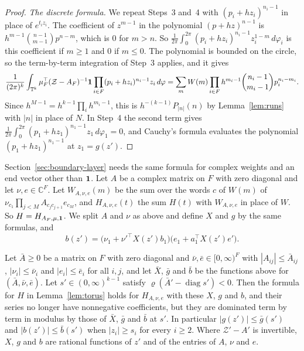 \begin{proof}
\emph{The discrete formula.} We repeat Steps~3 and~4 with $(p_i+hz_i)^{n_i-1}$ in
place of $e^{t_iz_i}$. The coefficient of $z^{m-1}$ in the polynomial
$(p+hz)^{n-1}$ is $h^{m-1}\binom{n-1}{m-1}p^{n-m}$, which is $0$ for $m>n$. So
$\frac1{2\pi}\int_0^{2\pi}(p_i+hz_i)^{n_i-1}z_i^{1-m}\,d\varphi_i$ is this
coefficient if $m\ge1$ and $0$ if $m\le0$. The polynomial is bounded on the
circle, so the term-by-term integration of Step~3 applies, and it gives
\[
\frac1{(2\pi)^k}\int_{\mathbb T^k}\mu_F^\top(\mathcal Z-A_F)^{-1}\mathbf{1}
\prod_{i\in F}(p_i+hz_i)^{n_i-1}z_i\,d\varphi
=\sum_mW(m)\prod_{i\in F}h^{m_i-1}\binom{n_i-1}{m_i-1}p_i^{n_i-m_i}.
\]
Since $h^{M-1}=h^{k-1}\prod_ih^{m_i-1}$, this is $h^{-(k-1)}P_{|n|}(n)$ by
Lemma~\ref{lem:runs} with $|n|$ in place of $N$. In Step~4 the second term gives
$\frac1{2\pi}\int_0^{2\pi}(p_1+hz_1)^{n_1-1}z_1\,d\varphi_1=0$, and Cauchy's formula
evaluates the polynomial $(p_1+hz_1)^{n_1-1}$ at $z_1=g(z')$.
\end{proof}

Section~\ref{sec:boundary-layer} needs the same formula for complex weights and an end vector
other than $\mathbf{1}$. Let $A$ be a complex matrix on $F$ with zero diagonal and let
$\nu,e\in\mathbb C^F$. Let $W_{A,\nu,e}(m)$ be the sum over the words $c$ of $W(m)$ of
$\nu_{c_1}\prod_{j<M}A_{c_jc_{j+1}}e_{c_M}$, and $H_{A,\nu,e}(t)$ the sum $H(t)$ with $W_{A,\nu,e}$
in place of $W$. So $H=H_{A_F,\mu,\mathbf{1}}$. We split $A$ and $\nu$ as above and define $X$ and $g$
by the same formulas, and
\[
b(z')=\bigl(\nu_1+\nu'^\top X(z')b_1\bigr)\bigl(e_1+a_1^\top X(z')e'\bigr).
\]

\begin{lemma}\label{lem:torus-complex}
Let $\bar A\ge0$ be a matrix on $F$ with zero diagonal and $\bar\nu,\bar e\in[0,\infty)^F$ with
$|A_{ij}|\le\bar A_{ij}$, $|\nu_i|\le\bar\nu_i$ and $|e_i|\le\bar e_i$ for all $i,j$, and let
$\bar X$, $\bar g$ and $\bar b$ be the functions above for $(\bar A,\bar\nu,\bar e)$. Let
$s'\in(0,\infty)^{k-1}$ satisfy $\varrho(\bar A'-\operatorname{diag}s')<0$. Then
the formula for $H$ in Lemma~\ref{lem:torus} holds for $H_{A,\nu,e}$ with these $X$, $g$
and $b$, and their
series no longer have nonnegative coefficients, but they are dominated term by term in modulus by those of $\bar X$, $\bar g$ and $\bar b$ at $s'$.
In particular $|g(z')|\le\bar g(s')$ and $|b(z')|\le\bar b(s')$ when $|z_i|\ge s_i$ for every
$i\ge2$. Where $\mathcal Z'-A'$ is invertible, $X$, $g$ and $b$ are rational functions of $z'$ and
of the entries of $A$, $\nu$ and $e$.
\end{lemma}

